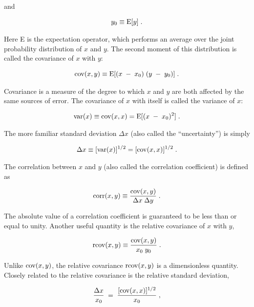 \noindent
and

\begin{equation}
   y_0 \equiv {\rm E}[y] \; .
\end{equation}

\noindent
Here E is the expectation operator, which performs an average over the
joint probability distribution of $x$ and $y$.  The second moment of
this distribution is called the covariance of $x $ with $y$:

\begin{equation}
{\rm cov} (x,y) \equiv {\rm E}[(x\;-\;x_0)\;(y\;-\;y_0)]\;.
\label{cov}
\end{equation}

\noindent
Covariance is a measure of the degree to which $x$ and $y$ are both
affected by the same sources of error.  The covariance of $x$ with
itself is called the variance of $x$:

\begin{equation}
{\rm var}(x) \equiv {\rm cov}(x,x) = {\rm E}[(x\;-\;x_0)^2]\;.
\end{equation}

\noindent
The more familiar standard deviation $\Delta x$ (also called the
``uncertainty'') is simply

\begin{equation}
\Delta x \equiv [{\rm var} (x)]^{1/2} = [{\rm cov}(x,x)]^{1/2} \; .
\label{deltax}
\end{equation}

\noindent
The correlation between $x$ and $y$ (also called the correlation
coefficient) is defined as

\begin{equation}
{\rm corr}(x,y) \equiv \frac{{\rm cov}(x,y)}{\Delta x\;\Delta y} \;.
\label{corr}
\end{equation}

\noindent
The absolute value of a correlation coefficient is guaranteed to be
less than or equal to unity.  Another useful quantity is the relative
covariance of $x$ with $y$,

\begin{equation}
{\rm rcov}(x,y) \equiv \frac {{\rm cov}(x,y)}{x_0 \; y_0} \;.
\label{rcov}
\end{equation}

\noindent
Unlike ${\rm cov}(x,y)$, the relative
{\rm cov}ariance ${\rm rcov}(x,y)$ is a dimensionless quantity.
Closely related to the relative covariance is the relative standard
deviation,

\begin{equation}
\frac {\Delta x}{x_0} \;=\; \frac {[{\rm cov}(x,x)]^{1/2}}{x_0} \;,
\end{equation}

